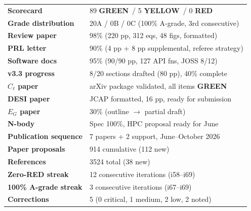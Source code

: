 \documentclass[11pt,a4paper]{article}
\newcommand{\GREEN}{\textcolor{dfdgreen}{\textbf{GREEN}}}
\newcommand{\YELLOW}{\textcolor{dfdyellow}{\textbf{YELLOW}}}
\newcommand{\RED}{\textcolor{dfdred}{\textbf{RED}}}
\begin{document}
\begin{tcolorbox}[colback=green!5,colframe=dfdgreen,title=i69 State]
\begin{center}
\begin{tabular}{ll}
\textbf{Scorecard} & 89 \GREEN\ / 5 \YELLOW\ / 0 \RED \\
\textbf{Grade distribution} & 20A / 0B / 0C (100\% A-grade, 3rd consecutive) \\
\textbf{Review paper} & 98\% (220 pp, 312 eqs, 48 figs, formatted) \\
\textbf{PRL letter} & 90\% (4 pp + 8 pp supplemental, referee strategy) \\
\textbf{Software docs} & 95\% (90/90 pp, 127 API fns, JOSS 8/12) \\
\textbf{v3.3 progress} & 8/20 sections drafted (80 pp), 40\% complete \\
\textbf{$C_\ell$ paper} & arXiv package validated, all items \GREEN \\
\textbf{DESI paper} & JCAP formatted, 16 pp, ready for submission \\
\textbf{$E_G$ paper} & 30\% (outline $\to$ partial draft) \\
\textbf{N-body} & Spec 100\%, HPC proposal ready for June \\
\textbf{Publication sequence} & 7 papers + 2 support, June--October 2026 \\
\textbf{Paper proposals} & 914 cumulative (112 new) \\
\textbf{References} & 3524 total (38 new) \\
\textbf{Zero-RED streak} & 12 consecutive iterations (i58--i69) \\
\textbf{100\% A-grade streak} & 3 consecutive iterations (i67--i69) \\
\textbf{Corrections} & 5 (0 critical, 1 medium, 2 low, 2 noted) \\
\end{tabular}
\end{center}
\end{tcolorbox}
\end{document}
